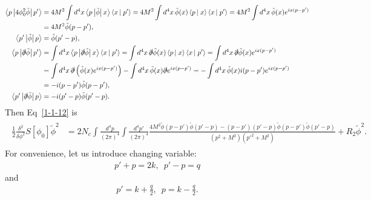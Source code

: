 \documentclass[tightenlines,floatfix,nofootinbib,superscriptaddress,fleqn]{revtex4-2}
\begin{document}
\begin{align}\label{1-1-13}
  \begin{split}
    \left<p\left|4\phi_0^2\tilde{\phi}\right|p'\right>
    &=4M^2\int d^4x\left<p\left|\tilde{\phi}
    \right|x\right>\left<x\left| \right.p'\right>
    =4M^2\int d^4x\,\tilde{\phi}(x)\left<p\left|
    \right.x\right>\left<x\left| \right.p'\right>
    =4M^2\int d^4x\,\tilde{\phi}(x)e^{ix(p-p')} \\
    &= 4M^2\tilde{\phi}(p-p'), \\
    \left<p'\left|\tilde{\phi}\right|p\right>&=\tilde{\phi}(p'-p),  \\
    \left<p\left|\slashed{\partial}\tilde{\phi}\right|p'\right>&= 
    \int d^4x\left<p\left|\slashed{\partial}\tilde{\phi}
    \right|x\right>\left<x\left| \right.p'\right>
    =\int d^4x\,\slashed{\partial}\tilde{\phi}(x)\left<p\left|
    \right.x\right>\left<x\left| \right.p'\right>
    =\int d^4x\,\slashed{\partial}\tilde{\phi}(x)e^{ix(p-p')} \\
    &=\int d^4x\,\slashed{\partial}\left(\tilde{\phi}(x)e^{ix(p-p')}\right)
    -\int d^4x\,\tilde{\phi}(x)\slashed{\partial}e^{ix(p-p')}
    =-\int d^4x\,\tilde{\phi}(x)i(p-p')e^{ix(p-p')} \\
    &=-i(p-p')\tilde{\phi}(p-p'),
    \\
    \left<p'\left|\slashed{\partial}\tilde{\phi}\right|p\right>&=  
    -i(p'-p)\tilde{\phi}(p'-p).
  \end{split}
\end{align}
Then Eq~\eqref{1-1-12} is
\begin{align}\label{1-1-14}
  \begin{split}
    \frac{1}{2}\frac{\delta^2}{\delta\phi^2}S[\phi_0]\tilde{\phi}^2
    &=2N_c\int\frac{d^4p}{(2\pi)^4}\int\frac{d^4p'}{(2\pi)^4}
    \frac{4M^2\tilde{\phi}(p-p')
    \tilde{\phi}(p'-p)
  -(p-p')(p'-p)\tilde{\phi}(p-p')
   \tilde{\phi}(p'-p)}{(p^2+M^2)(p'^2+M^2)}+R_2\tilde{\phi}^2.
  \end{split}
\end{align}
For convenience, let us introduce changing variable:
\begin{align}
  p'+p=2k,\,\,\,p'-p=q
\end{align}
and
\begin{align}
  p'=k+\frac{q}{2},\,\,\, p =k-\frac{q}{2}.
\end{align}
\end{document}
